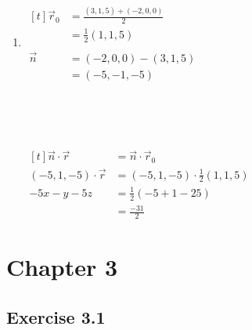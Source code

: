\documentclass[11pt,fleqn]{book} %
\begin{document}
\begin{enumerate}
    {~~~}

    \item 
    $\begin{aligned}[t]
        \vec{r}_0 & = \frac{(3, 1, 5) + (-2, 0, 0)}{2} \\
                  & = \frac{1}{2} (1, 1, 5)
        \\ \\
        \vec{n}   & = (-2, 0, 0) - (3, 1, 5)           \\
                  & = (-5, -1, -5)
    \end{aligned}$

    {~~~}

    {~~~}

    $\begin{aligned}[t]
        \vec{n} \cdot \vec{r}     & = \vec{n} \cdot \vec{r}_0                \\
        (-5, 1, -5) \cdot \vec{r} & = (-5, 1, -5) \cdot \frac{1}{2}(1, 1, 5) \\
        -5x - y - 5z              & = \frac{1}{2}(-5 + 1 - 25)               \\
                                  & = \frac{-31}{2}
    \end{aligned}$
\end{enumerate}

\section*{Chapter 3}

\subsection*{Exercise 3.1}
\end{document}

